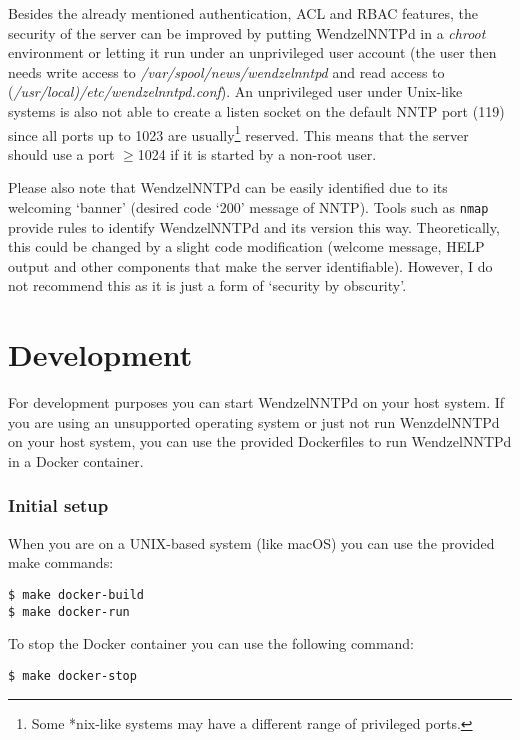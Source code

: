 \documentclass[12pt,fleqn,leqno]{scrbook}
\begin{document}
Besides the already mentioned authentication, ACL and RBAC features, the
security of the server can be improved by putting WendzelNNTPd in a
\emph{chroot} environment or letting it run under an unprivileged user
account (the user then needs write access to
\emph{/var/spool/news/wendzelnntpd} and read access to
(\emph{/usr/local)/etc/wendzelnntpd.conf}). An unprivileged user under
Unix-like systems is also not able to create a listen socket on the
default NNTP port (119) since all ports up to 1023 are
usually\footnote{Some *nix-like systems may have a different range of
  privileged ports.} reserved. This means that the server should use a
port \(\geq\)1024 if it is started by a non-root user.

Please also note that WendzelNNTPd can be easily identified due to its
welcoming `banner' (desired code `200' message of NNTP). Tools such as
\texttt{nmap} provide rules to identify WendzelNNTPd and its version
this way. Theoretically, this could be changed by a slight code
modification (welcome message, HELP output and other components that
make the server identifiable). However, I do not recommend this as it is
just a form of `security by obscurity'.

\hypertarget{development-1}{%
\section{Development}\label{development-1}}

For development purposes you can start WendzelNNTPd on your host system.
If you are using an unsupported operating system or just not run
WenzdelNNTPd on your host system, you can use the provided Dockerfiles
to run WendzelNNTPd in a Docker container.

\hypertarget{initial-setup-1}{%
\subsubsection{Initial setup}\label{initial-setup-1}}

When you are on a UNIX-based system (like macOS) you can use the
provided make commands:

\begin{verbatim}
$ make docker-build
$ make docker-run
\end{verbatim}

To stop the Docker container you can use the following command:

\begin{verbatim}
$ make docker-stop
\end{verbatim}
\end{document}
